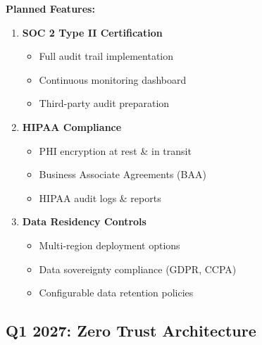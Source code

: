 \textbf{Planned Features:}
\begin{enumerate}
    \item \textbf{SOC 2 Type II Certification}
    \begin{itemize}
        \item Full audit trail implementation
        \item Continuous monitoring dashboard
        \item Third-party audit preparation
    \end{itemize}
    
    \item \textbf{HIPAA Compliance}
    \begin{itemize}
        \item PHI encryption at rest \& in transit
        \item Business Associate Agreements (BAA)
        \item HIPAA audit logs \& reports
    \end{itemize}
    
    \item \textbf{Data Residency Controls}
    \begin{itemize}
        \item Multi-region deployment options
        \item Data sovereignty compliance (GDPR, CCPA)
        \item Configurable data retention policies
    \end{itemize}
\end{enumerate}

\subsection{Q1 2027: Zero Trust Architecture}

